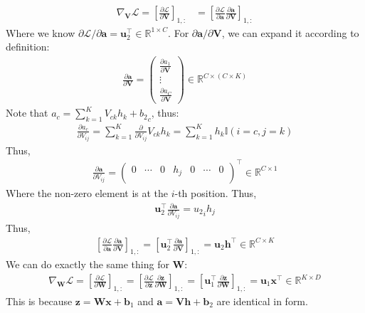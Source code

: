\documentclass[11pt, a4paper, oneside]{memoir}
\begin{document}
\begin{align*}
    \nabla_{\mathbf{V}} \mathcal{L} = \left[ \frac{\partial \mathcal{L}}{\partial \mathbf{V}} \right]_{1,:}
     & = \left[ \frac{\partial \mathcal{L}}{\partial \boldsymbol{a}} \frac{\partial \boldsymbol{a}}{\partial \mathbf{V}} \right]_{1,:}
\end{align*}
Where we know $\partial \mathcal{L} /\partial \boldsymbol{a} = \boldsymbol{u}_2^\top \in \mathbb{R}^{1\times C}$.
For $\partial \boldsymbol{a} / \partial \mathbf{V}$, we can expand it according to definition:
\begin{align*}
    \frac{\partial \boldsymbol{a}}{\partial \mathbf{V}} =
    \begin{pmatrix}
        \frac{\partial a_1}{\partial \mathbf{V}} \\
        \vdots                                   \\
        \frac{\partial a_C}{\partial \mathbf{V}}
    \end{pmatrix} \in \mathbb{R}^{C \times (C \times K)}
\end{align*}
Note that $a_c=\sum_{k=1}^{K} V_{ck} h_k + {b_2}_c$, thus:
\begin{align*}
    \frac{\partial a_c}{\partial V_{ij}} = \sum_{k=1}^{K} \frac{\partial}{\partial V_{ij}} V_{ck} h_k = \sum_{k=1}^{K} h_k \mathbb{I}(i=c,j=k)
\end{align*}
Thus,
\begin{align*}
    \frac{\partial \boldsymbol{a}}{\partial V_{ij}} =
    \begin{pmatrix}
        0 & \cdots & 0 & h_j & 0 & \cdots & 0 \\
    \end{pmatrix}^\top \in \mathbb{R}^{C \times 1}
\end{align*}
Where the non-zero element is at the $i$-th position.
Thus,
\begin{align*}
    \boldsymbol{u}_2^\top \frac{\partial \boldsymbol{a}}{\partial V_{ij}} = {u_2}_i h_j
\end{align*}
Thus,
\begin{align*}
    \left[ \frac{\partial \mathcal{L}}{\partial \boldsymbol{a}} \frac{\partial \boldsymbol{a}}{\partial \mathbf{V}} \right]_{1,:}
    = \left[ \boldsymbol{u}_2^\top \frac{\partial \boldsymbol{a}}{\partial \mathbf{V}} \right]_{1,:}
    = \boldsymbol{u}_2 \boldsymbol{h}^\top \in \mathbb{R}^{C \times K}
\end{align*}
We can do exactly the same thing for $\mathbf{W}$:
\begin{align*}
    \nabla_{\mathbf{W}} \mathcal{L} = \left[ \frac{\partial \mathcal{L}}{\partial \mathbf{W}} \right]_{1,:}
    = \left[ \frac{\partial \mathcal{L}}{\partial \boldsymbol{z}} \frac{\partial \boldsymbol{z}}{\partial \mathbf{W}} \right]_{1,:}
    = \left[ \boldsymbol{u}_1^\top \frac{\partial \boldsymbol{z}}{\partial \mathbf{W}} \right]_{1,:}
    = \boldsymbol{u}_1 \boldsymbol{x}^\top \in \mathbb{R}^{K \times D}
\end{align*}
This is because $\boldsymbol{z}=\mathbf{W}\boldsymbol{x}+\boldsymbol{b}_1$ and
$\boldsymbol{a}=\mathbf{V}\boldsymbol{h}+\boldsymbol{b}_2$ are identical in form.
\end{document}
